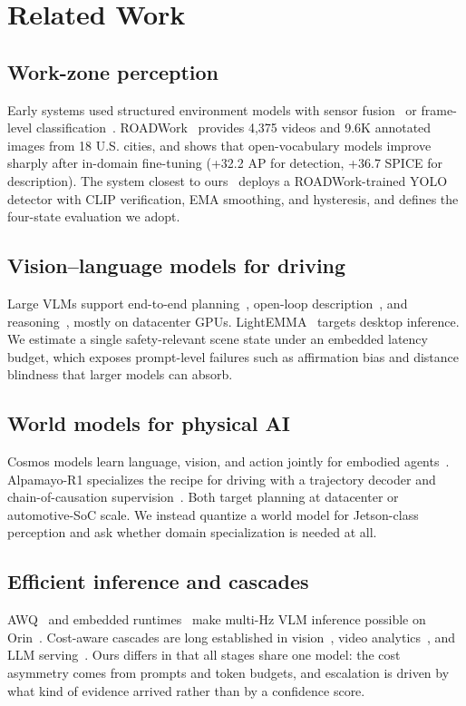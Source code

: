 \documentclass[journal]{IEEEtran}
\begin{document}
\section{Related Work}
\label{sec:related}

\subsection{Work-zone perception}
Early systems used structured environment models with sensor fusion~\cite{shi2021workzone} or frame-level classification~\cite{abodo2018shrp}.  ROADWork~\cite{ghosh2025roadwork} provides 4{,}375 videos and 9.6K annotated images from 18 U.S. cities, and shows that open-vocabulary models improve sharply after in-domain fine-tuning (+32.2 AP for detection, +36.7 SPICE for description).  The system closest to ours~\cite{priorsystem2026} deploys a ROADWork-trained YOLO detector with CLIP verification, EMA smoothing, and hysteresis, and defines the four-state evaluation we adopt.

\subsection{Vision--language models for driving}
Large VLMs support end-to-end planning~\cite{hwang2024emma,tian2024drivevlm}, open-loop description~\cite{marcu2024lingoqa}, and reasoning~\cite{nvidia2025cosmosreason}, mostly on datacenter GPUs. LightEMMA~\cite{lightemma2025} targets desktop inference.  We estimate a single safety-relevant scene state under an embedded latency budget, which exposes prompt-level failures such as affirmation bias and distance blindness that larger models can absorb.

\subsection{World models for physical AI}
Cosmos models learn language, vision, and action jointly for embodied agents~\cite{nvidia2025cosmosreason,nvidia2026cosmos3}.  Alpamayo-R1 specializes the recipe for driving with a trajectory decoder and chain-of-causation supervision~\cite{alpamayo2026}.  Both target planning at datacenter or automotive-SoC scale.  We instead quantize a world model for Jetson-class perception and ask whether domain specialization is needed at all.

\subsection{Efficient inference and cascades}
AWQ~\cite{lin2024awq} and embedded runtimes~\cite{trtedgellm} make multi-Hz VLM inference possible on Orin~\cite{chu2024mobilevlm,lin2024vila}.  Cost-aware cascades are long established in vision~\cite{viola2001rapid}, video analytics~\cite{kang2017noscope}, and LLM serving~\cite{chen2023frugalgpt,gatekeeper2025}.  Ours differs in that all stages share one model: the cost asymmetry comes from prompts and token budgets, and escalation is driven by what kind of evidence arrived rather than by a confidence score.
\end{document}
